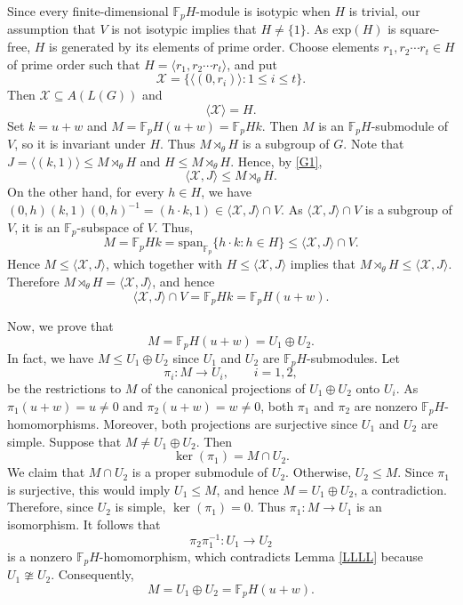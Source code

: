 \documentclass[12pt]{article}
\begin{document}
Since every finite-dimensional $\mathbb{F}_pH$-module is isotypic when $H$ is trivial, 
our assumption that $V$ is not isotypic implies that $H\neq\{1\}$. As $\mbox{exp}(H)$ is square-free, $H$ is generated by its elements of prime order. 
Choose elements $r_1,r_2\cdots r_t\in H$ of prime order such that $H=\langle r_1,r_2\cdots r_t\rangle$, and put 
$$\mathcal{X}=\{\langle(0,r_i)\rangle: 1\leq i\leq t\}.$$
Then $\mathcal{X}\subseteq A(L(G))$
and \begin{equation}\label{G1}
\langle\mathcal{X}\rangle= H.    
\end{equation}
Set $k=u+w$ and $M=\mathbb{F}_{p}H(u+w)=\mathbb{F}_{p}Hk$. 
Then $M$ is an $\mathbb{F}_{p}H$-submodule of $V$, 
so it is invariant under $H$. Thus $M\rtimes_\theta H$ 
is a subgroup of $G$. Note that $J=\langle (k,1)\rangle \leq M\rtimes_\theta H$ 
and $H\leq M\rtimes_\theta H$. Hence, by \eqref{G1}, 
$$\langle\mathcal{X},J\rangle\leq M\rtimes_\theta H.$$
On the other hand, for every $h\in H$, we have 
$(0, h)(k,1)(0,h)^{-1}=(h\cdot k, 1)\in \langle\mathcal{X},J\rangle \cap V$. 
As $\langle\mathcal{X},J\rangle \cap V$ is a subgroup of $V$, it is 
an $\mathbb{F}_{p}$-subspace of $V$. Thus, 
$$M=\mathbb{F}_{p}Hk=\mbox{span}_{\mathbb{F}_p}\{h\cdot k: h\in H\}\leq \langle\mathcal{X},J\rangle \cap V.$$ 
Hence $M\leq \langle\mathcal{X},J\rangle$, 
which together with $H\leq \langle\mathcal{X},J\rangle$ implies that $M\rtimes_\theta H\leq \langle\mathcal{X},J\rangle$. 
Therefore $M\rtimes_\theta H=\langle\mathcal{X},J\rangle$, and hence 
\begin{equation}\label{G2}
\langle\mathcal{X},J\rangle \cap V=\mathbb{F}_{p}Hk=\mathbb{F}_{p}H(u+w). 
\end{equation}


Now, we prove that
\begin{equation}\label{G3}
M=\mathbb{F}_{p}H(u+w)=U_1\oplus U_2.  
\end{equation}
In fact, we have $M\leq U_1\oplus U_2$ since $U_1$ and $U_2$ are $\mathbb{F}_{p}H$-submodules.
Let $$\pi_i:M\longrightarrow U_i,\qquad i=1,2,$$
be the restrictions to $M$ of the canonical projections of $U_1\oplus U_2$ 
onto $U_i$. As $\pi_1(u+w)=u\neq 0$ and $\pi_2(u+w)=w\neq 0$, 
both $\pi_1$ and $\pi_2$ are nonzero $\mathbb{F}_pH$-homomorphisms.
Moreover, both projections are surjective since $U_1$ and $U_2$ are simple. 
Suppose that $M\neq U_1\oplus U_2$. Then $$\ker(\pi_1)=M\cap U_2.$$
We claim that $M\cap U_2$ is a proper submodule of $U_2$. 
Otherwise, $U_2\le M$. Since $\pi_1$ is surjective, 
this would imply $U_1\le M$, and hence $M=U_1\oplus U_2$, a contradiction.
Therefore, since $U_2$ is simple, $\ker(\pi_1)=0$.
Thus $\pi_1:M\to U_1$ is an isomorphism. It follows that
$$\pi_2\pi_1^{-1}:U_1\longrightarrow U_2$$
is a nonzero $\mathbb{F}_pH$-homomorphism, which contradicts 
Lemma \ref{LLLL} because $U_1\ncong U_2$. Consequently, $$M=U_1\oplus U_2=\mathbb{F}_{p}H(u+w).$$
\end{document}
